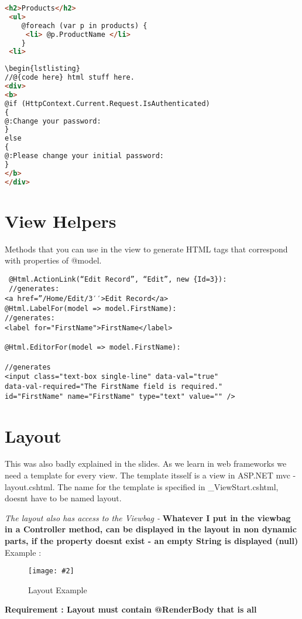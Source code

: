 \documentclass[a4paper,10pt]{scrreprt}
\newcommand{\pic}[2][figure]{\begin{figure}[h]
 \centering
 \texttt{[image: \#2]}
 \caption{#1}
\end{figure}
}
\begin{document}
\begin{lstlisting}[caption=Normal Razor ASP.NET MVC,language=html]
 <h2>Products</h2>
 <ul>
    @foreach (var p in products) {
     <li> @p.ProductName </li>
    }
 <li>
\end{lstlisting}

\begin{lstlisting}[caption=Specified Code Block ASP.NET MVC,language=html]
\begin{lstlisting}
//@{code here} html stuff here. 
<div>
<b>
@if (HttpContext.Current.Request.IsAuthenticated)
{
@:Change your password:
}
else
{
@:Please change your initial password:
}
</b>
</div>
\end{lstlisting}

\section{View Helpers}
Methods that you can use in the view to generate HTML tags that correspond with properties of @model.
\begin{lstlisting}
 @Html.ActionLink(“Edit Record”, “Edit”, new {Id=3}):
 //generates:
<a href=”/Home/Edit/3′′>Edit Record</a>
@Html.LabelFor(model => model.FirstName):
//generates:
<label for="FirstName">FirstName</label>

@Html.EditorFor(model => model.FirstName):

//generates 
<input class="text-box single-line" data-val="true"
data-val-required="The FirstName field is required."
id="FirstName" name="FirstName" type="text" value="" />
\end{lstlisting}

\section{Layout}
This was also badly explained in the slides.
As we learn in web frameworks we need a template for every view. The template itsself is a view in ASP.NET mvc - 
layout.cshtml. The name for the template is specified in \_ViewStart.cshtml, doesnt have to be named layout.

\textit{The layout also has access to the Viewbag -}
\textbf{Whatever I put in the viewbag in a Controller method, can be displayed in the layout in non dynamic parts, if 
the property doesnt exist - an empty String is displayed (null)}
Example :
\pic[Layout Example] {layout_example.png}

\textbf{Requirement : Layout must contain @RenderBody that is all}
\end{document}
